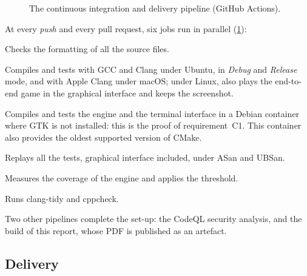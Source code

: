 \begin{figure}[ht]
    \caption{The continuous integration and delivery pipeline (GitHub Actions).}
    \label{fig-ci}
\end{figure}

At every \emph{push} and every pull request, six jobs run in parallel (\cref{fig-ci}):

\begin{description}[style=nextline, leftmargin=1.2em]
    \item[format] Checks the formatting of all the source files.
    \item[build] Compiles and tests with GCC and Clang under Ubuntu, in \emph{Debug} and
          \emph{Release} mode, and with Apple Clang under macOS; under Linux, also plays the
          end-to-end game in the graphical interface and keeps the screenshot.
    \item[headless] Compiles and tests the engine and the terminal interface in a Debian
          container where GTK is not installed: this is the proof of requirement~C1. This
          container also provides the oldest supported version of CMake.
    \item[sanitizers] Replays all the tests, graphical interface included, under ASan and
          UBSan.
    \item[coverage] Measures the coverage of the engine and applies the threshold.
    \item[lint] Runs clang-tidy and cppcheck.
\end{description}

Two other pipelines complete the set-up: the CodeQL security analysis, and the build of this
report, whose PDF is published as an artefact.

\subsection{Delivery}

